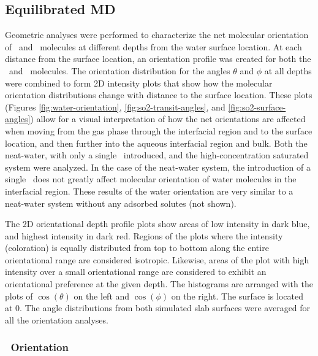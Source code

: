 \subsection{Equilibrated MD}

Geometric analyses were performed to characterize the net molecular orientation of \wat~and \suldiox~molecules at different depths from the water surface location. At each distance from the surface location, an orientation profile was created for both the \wat~and \suldiox~molecules. The orientation distribution for the angles $\theta$ and $\phi$ at all depths were combined to form 2D intensity plots that show how the molecular orientation distributions change with distance to the surface location. These plots (Figures \ref{fig:water-orientation}, \ref{fig:so2-transit-angles}, and \ref{fig:so2-surface-angles}) allow for a visual interpretation of how the net orientations are affected when moving from the gas phase through the interfacial region and to the surface location, and then further into the aqueous interfacial region and bulk. Both the neat-water, with only a single \suldiox~introduced, and the high-concentration saturated system were analyzed. In the case of the neat-water system, the introduction of a single \suldiox~does not greatly affect molecular orientation of water molecules in the interfacial region. These results of the water orientation are very similar to a neat-water system without any adsorbed solutes (not shown).

The 2D orientational depth profile plots show areas of low intensity in dark blue, and highest intensity in dark red. Regions of the plots where the intensity (coloration) is equally distributed from top to bottom along the entire orientational range are considered isotropic. Likewise, areas of the plot with high intensity over a small orientational range are considered to exhibit an orientational preference at the given depth.  The histograms are arranged with the plots of $\cos(\theta)$ on the left and $\cos(\phi)$ on the right. The surface is located at 0\angs. The angle distributions from both simulated slab surfaces were averaged for all the orientation analyses.

\subsubsection{\wat~Orientation}

